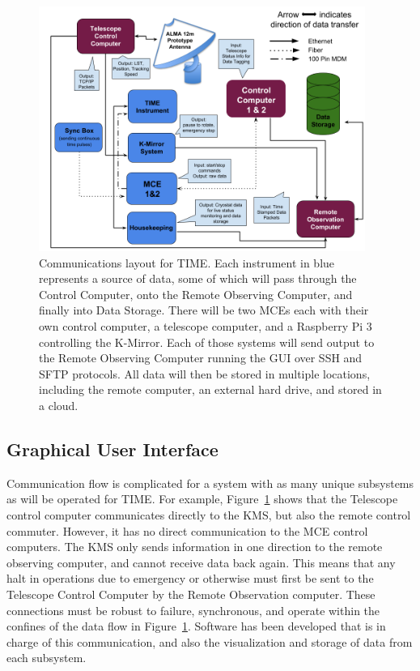 \documentclass[manuscript]{aastex}
\begin{document}
\begin{figure}[H]
\centering
\captionsetup{width=0.95\textwidth}
\includegraphics[width=0.95\textwidth]{km9.png}
\caption[TIME Control Flow Diagram]{Communications layout for TIME. Each instrument in blue represents a source of data, some of which will pass through the Control Computer, onto the Remote Observing Computer, and finally into Data Storage. There will be two MCEs each with their own control computer, a telescope computer, and a Raspberry Pi 3 controlling the K-Mirror. Each of those systems will send output to the Remote Observing Computer running the GUI over SSH and SFTP protocols. All data will then be stored in multiple locations, including the remote computer, an external hard drive, and stored in a cloud.}
\label{fig:km9}
\end{figure}
\subsection{Graphical User Interface}
Communication flow is complicated for a system with as many unique subsystems as will be operated for TIME. For example, Figure~\ref{fig:km9} shows that the Telescope control computer communicates directly to the KMS, but also the remote control commuter. However, it has no direct communication to the MCE control computers. The KMS only sends information in one direction to the remote observing computer, and cannot receive data back again. This means that any halt in operations due to emergency or otherwise must first be sent to the Telescope Control Computer by the Remote Observation computer. These connections must be robust to failure, synchronous, and operate within the confines of the data flow in Figure~\ref{fig:km9}. Software has been developed that is in charge of this communication, and also the visualization and storage of data from each subsystem. 
\end{document}
